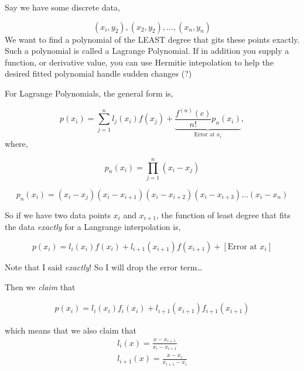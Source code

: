 \documentclass[12pt]{article}
\begin{document}
Say we have some discrete data,

\begin{equation*}
    \left( x_{i},y_2 \right),\left( x_2, y_2 \right), \dots , \left( x_n,y_n \right)
\end{equation*}
We want to find a polynomial of the LEAST degree that gits these points exactly. 
Such a polynomial is called a Lagrange Polynomial. If in addition you supply a
function, or derivative value, you can use Hermitie intepolation to help the 
desired fitted polynomial handle sudden changes (?)

For Lagrange Polynomials, the general form is,

\begin{equation*}
    p\left( x_i  \right) =
    \sum_{j=1}^{n} l_j(x_i) f(x_j) + \underbrace{\frac{f^{(n)}\left( c \right)}
    {n!}p_n(x_i)}_{\text{Error at } x_i},
\end{equation*}
where,

\begin{equation*}
    p_n(x_i) = \prod_{j = 1}^{n} \left( x_i - x_j \right) 
\end{equation*}

\begin{equation*}
    p_n(x_i) =  \left( x_{i} - x_{j} \right) 
    \left( x_i - x_{i+1} \right)
    \left( x_i - x_{i+2} \right)
    \left( x_i - x_{i+3} \right) \dots
    ( x_i - x_n)
\end{equation*}

So if we have two data points $x_i$ and $x_{i+1}$, the function of least degree
that fits the data \textit{exactly} for a Langrange interpolation is,

\begin{equation*}
    p(x_i) = l_{i}(x_i)f(x_{i}) + l_{i+1}(x_{i+1})f(x_{i+1}) + \left[\text{
        Error at $x_i$}
    \right]
\end{equation*}

Note that I said \textit{exactly}! So I will drop the error term\dots

Then we \textit{claim} that

\begin{align*}
    p(x_i) =  
    l_i\left( x_i\right)f_i\left( x_i\right) + 
    l_{i+1}\left( x_{i+1}\right)f_{i+1}\left( x_{i+1}\right) 
\end{align*}

which means that we also claim that
\begin{align*}
    l_i(x) = \frac{x - x_{i+1}}{x_{i} - x_{i+1}} \\
    l_{i+1}(x) = \frac{x - x_{i}}{x_{i+1} - x_{i}}
\end{align*}
\end{document}
